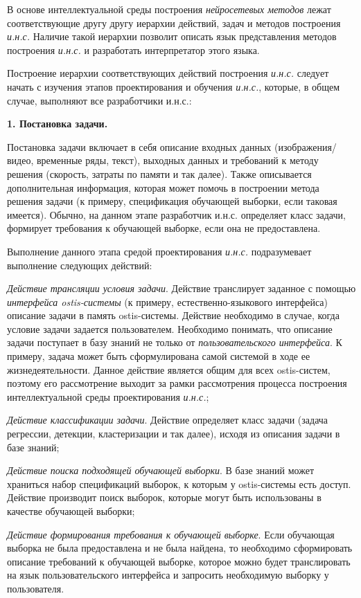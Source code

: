 В основе интеллектуальной среды построения \textit{нейросетевых методов} лежат соответствующие другу другу иерархии действий, задач и методов построения \textit{и.н.с.} Наличие такой иерархии позволит описать язык представления методов построения \textit{и.н.с.} и разработать интерпретатор этого языка.

Построение иерархии соответствующих действий построения \textit{и.н.с.} следует начать с изучения этапов проектирования и обучения \textit{и.н.с.}, которые, в общем случае, выполняют все разработчики и.н.с.:


\textbf{1. Постановка задачи. }

Постановка задачи включает в себя описание входных данных (изображения/видео, временные ряды, текст), выходных данных и требований к методу решения (скорость, затраты по памяти и так далее). Также описывается дополнительная информация, которая может помочь в построении метода решения задачи (к примеру, спецификация обучающей выборки, если таковая имеется). Обычно, на данном этапе разработчик и.н.с. определяет класс задачи, формирует требования к обучающей выборке, если она не предоставлена.

Выполнение данного этапа средой проектирования \textit{и.н.с.} подразумевает выполнение следующих действий:
\begin{textitemize}
	\item \textit{Действие трансляции условия задачи}. Действие транслирует заданное с помощью \textit{интерфейса ostis-системы} (к примеру, естественно-языкового интерфейса) описание задачи в память ostis-системы. Действие необходимо в случае, когда условие задачи задается пользователем. Необходимо понимать, что описание задачи поступает в базу знаний не только от \textit{пользовательского интерфейса}. К примеру, задача может быть сформулирована самой системой в ходе ее жизнедеятельности.
	Данное действие является общим для всех ostis-систем, поэтому его рассмотрение выходит за рамки рассмотрения процесса построения интеллектуальной среды проектирования \textit{и.н.с.};
	\item \textit{Действие классификации задачи}. Действие определяет класс задачи (задача регрессии, детекции, кластеризации и так далее), исходя из описания задачи в базе знаний;
	\item \textit{Действие поиска подходящей обучающей выборки}. В базе знаний может храниться набор спецификаций выборок, к которым у ostis-системы есть доступ. Действие производит поиск выборок, которые могут быть использованы в качестве обучающей выборки;
	\item \textit{Действие формирования требования к обучающей выборке}. Если обучающая выборка не была предоставлена и не была найдена, то необходимо сформировать описание требований к обучающей выборке, которое можно будет транслировать на язык пользовательского интерфейса и запросить необходимую выборку у пользователя.
\end{textitemize}


